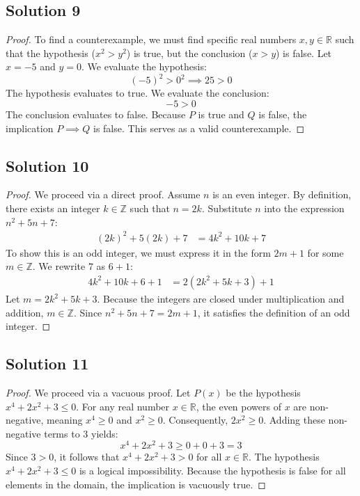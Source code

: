 \documentclass[12pt]{article}
\begin{document}
\subsection*{Solution 9}
\begin{proof}
To find a counterexample, we must find specific real numbers $x, y \in \mathbb{R}$ such that the hypothesis ($x^2 > y^2$) is true, but the conclusion ($x > y$) is false. 
Let $x = -5$ and $y = 0$. 
We evaluate the hypothesis:
\[ (-5)^2 > 0^2 \implies 25 > 0 \]
The hypothesis evaluates to true. 
We evaluate the conclusion:
\[ -5 > 0 \]
The conclusion evaluates to false. Because $P$ is true and $Q$ is false, the implication $P \implies Q$ is false. This serves as a valid counterexample.
\end{proof}

\subsection*{Solution 10}
\begin{proof}
We proceed via a direct proof. Assume $n$ is an even integer. By definition, there exists an integer $k \in \mathbb{Z}$ such that $n = 2k$. Substitute $n$ into the expression $n^2 + 5n + 7$:
\begin{align*}
    (2k)^2 + 5(2k) + 7 &= 4k^2 + 10k + 7
\end{align*}
To show this is an odd integer, we must express it in the form $2m + 1$ for some $m \in \mathbb{Z}$. We rewrite $7$ as $6 + 1$:
\begin{align*}
    4k^2 + 10k + 6 + 1 &= 2(2k^2 + 5k + 3) + 1
\end{align*}
Let $m = 2k^2 + 5k + 3$. Because the integers are closed under multiplication and addition, $m \in \mathbb{Z}$. Since $n^2 + 5n + 7 = 2m + 1$, it satisfies the definition of an odd integer.
\end{proof}

\subsection*{Solution 11}
\begin{proof}
We proceed via a vacuous proof. Let $P(x)$ be the hypothesis $x^4 + 2x^2 + 3 \le 0$. For any real number $x \in \mathbb{R}$, the even powers of $x$ are non-negative, meaning $x^4 \ge 0$ and $x^2 \ge 0$. Consequently, $2x^2 \ge 0$. Adding these non-negative terms to $3$ yields:
\[ x^4 + 2x^2 + 3 \ge 0 + 0 + 3 = 3 \]
Since $3 > 0$, it follows that $x^4 + 2x^2 + 3 > 0$ for all $x \in \mathbb{R}$. The hypothesis $x^4 + 2x^2 + 3 \le 0$ is a logical impossibility. Because the hypothesis is false for all elements in the domain, the implication is vacuously true.
\end{proof}
\end{document}
